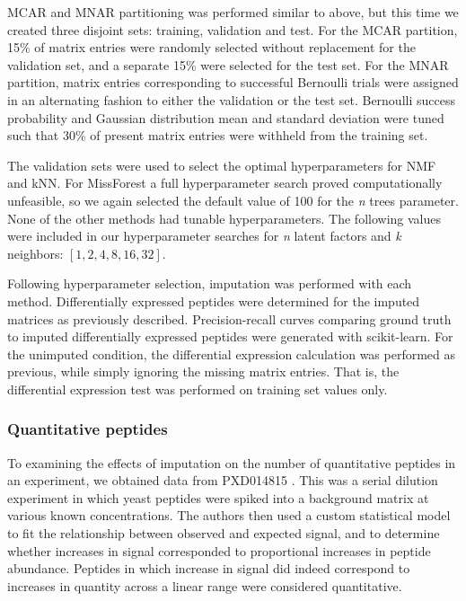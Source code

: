 \documentclass{article}
\begin{document}
MCAR and MNAR partitioning was performed similar to above, but this time we created three disjoint sets: training, validation and test. For the MCAR partition, 15\% of matrix entries were randomly selected without replacement for the validation set, and a separate 15\% were selected for the test set. For the MNAR partition, matrix entries corresponding to successful Bernoulli trials were assigned in an alternating fashion to either the validation or the test set. Bernoulli success probability and Gaussian distribution mean and standard deviation were tuned such that 30\% of present matrix entries were withheld from the training set.  

The validation sets were used to select the optimal hyperparameters for NMF and kNN. For MissForest a full hyperparameter search proved computationally unfeasible, so we again selected the default value of 100 for the \textit{n} trees parameter. None of the other methods had tunable hyperparameters. The following values were included in our hyperparameter searches for \textit{n} latent factors and \textit{k} neighbors: $[1,2,4,8,16,32]$.

Following hyperparameter selection, imputation was performed with each method. Differentially expressed peptides were determined for the imputed matrices as previously described. Precision-recall curves comparing ground truth to imputed differentially expressed peptides were generated with scikit-learn. For the unimputed condition, the differential expression calculation was performed as previous, while simply ignoring the missing matrix entries. That is, the differential expression test was performed on training set values only. 

\subsubsection{Quantitative peptides}

To examining the effects of imputation on the number of quantitative peptides in an experiment, we obtained data from PXD014815 \cite{matrix-matched-calib}. 
This was a serial dilution experiment in which yeast peptides were spiked into a background matrix at various known concentrations. The authors then used a custom statistical model to fit the relationship between observed and expected signal, and to determine whether increases in signal corresponded to proportional increases in peptide abundance. Peptides in which increase in signal did indeed correspond to increases in quantity across a linear range were considered quantitative.
\end{document}
